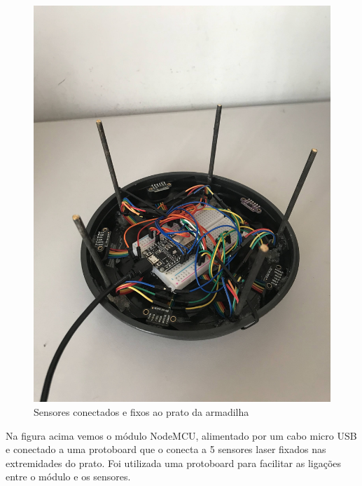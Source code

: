 \documentclass[
	12pt,				%
	openright,			%
	oneside,			%
	a4paper,			%
	chapter=TITLE,		%
	english,			%
	brazil				%
	]{abntex2}
\begin{document}
\begin{figure}[H]
    \centering
    \includegraphics[scale=0.09, angle=-90]{imagens/IMG_0606.jpg}
    \caption{Sensores conectados e fixos ao prato da armadilha}
    \label{fig:hardwareprato}
\end{figure}   

Na figura acima vemos o módulo NodeMCU, alimentado por um cabo micro USB e conectado a uma protoboard que o conecta a 5 sensores laser
fixados nas extremidades do prato. Foi utilizada uma protoboard para facilitar as ligações entre o módulo e os sensores. 
\end{document}
